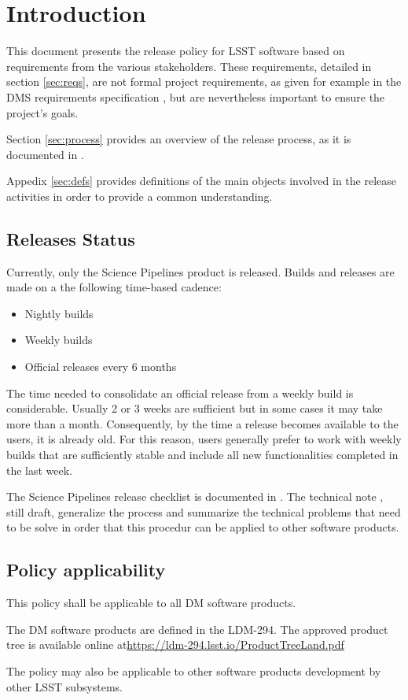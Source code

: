\section{Introduction} \label{sec:intro}

This document presents the release policy for \gls{LSST} software based on requirements from the various stakeholders.
These requirements, detailed in section \ref{sec:reqs}, are not formal project requirements, as given for example in the \gls{DMS} requirements specification , but are nevertheless important to ensure the project's goals.

Section \ref{sec:process} provides an overview of the release process, as it is documented in .

Appedix \ref{sec:defs} provides definitions of the main objects involved in the release activities in order to provide a common understanding. 


\subsection{Releases Status}\label{sec:sci}

Currently, only the \gls{Science Pipelines} product is released. 
Builds and releases are made on a the following time-based cadence:

\begin{itemize}
\item Nightly builds
\item Weekly builds
\item Official releases every 6 months
\end{itemize}

The time needed to consolidate an official release from a weekly build is considerable.
Usually 2 or 3 weeks are sufficient but in some cases it may take more than a month. 
Consequently, by the time a release becomes available to the users, it is already old.
For this reason, users generally prefer to work with weekly builds that are sufficiently stable and include all new functionalities completed in the last week.

The \gls{Science Pipelines} release checklist is documented in .
The technical note , still draft, generalize the process and summarize the technical problems that need to be solve in order that this procedur can be applied to other software products.


\subsection{Policy applicability} \label{sec:applicability}

This policy shall be applicable to all \gls{DM} software products.

The \gls{DM} software products are defined in the LDM-294. 
The approved product tree is available online at\url{https://ldm-294.lsst.io/ProductTreeLand.pdf}

The policy may also be applicable to other software products development by other \gls{LSST} subsystems.
